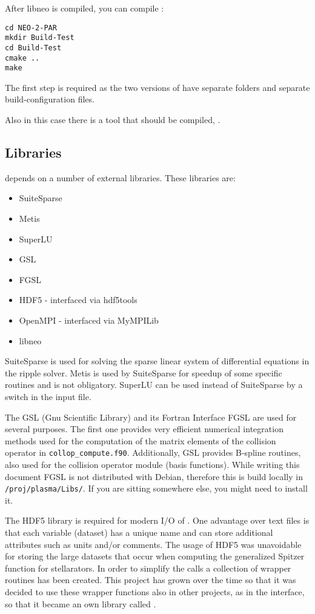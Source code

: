 \documentclass{article}
\newcommand{\vv}[1]{\texttt{\detokenize{#1}}}
\begin{document}
After libneo is compiled, you can compile \vv{neo-2}:
\begin{verbatim}
cd NEO-2-PAR
mkdir Build-Test
cd Build-Test
cmake ..
make
\end{verbatim}

The first step is required as the two versions of \vv{neo-2} have
separate folders and separate build-configuration files.

Also in this case there is a tool that should be compiled,
\vv{create_surfaces}.

\subsection{Libraries\label{technicalbackground_libraries}}
\vv{neo-2} depends on a number of external libraries. These libraries
are:
\begin{itemize}
\item SuiteSparse
\item Metis
\item SuperLU
\item GSL
\item FGSL
\item HDF5 - interfaced via hdf5tools
\item OpenMPI - interfaced via MyMPILib
\item libneo
\end{itemize}

SuiteSparse is used for solving the sparse linear system of differential
equations in the ripple solver. Metis is used by SuiteSparse for speedup
of some specific routines and is not obligatory. SuperLU can be used
instead of SuiteSparse by a switch in the input file.

The GSL (Gnu Scientific Library) and its Fortran Interface FGSL are used
for several purposes. The first one provides very efficient numerical
integration methods used for the computation of the matrix elements of
the collision operator in \verb|collop_compute.f90|. Additionally, GSL
provides B-spline routines, also used for the collision operator module
(basis functions). While writing this document FGSL is not distributed
with Debian, therefore this is build locally in \verb|/proj/plasma/Libs/|.
If you are sitting somewhere else, you might need to install it.

The HDF5 library is required for modern I/O of \vv{neo-2}. One advantage over
text files is that each variable (dataset) has a unique name and can
store additional attributes such as units and/or comments. The usage of HDF5
was unavoidable for storing the large datasets that occur when computing
the generalized Spitzer function for stellarators. In order to simplify
the calls a collection of wrapper routines has been created. This
project has grown over the time so that it was decided to use these
wrapper functions also in other projects, as in the interface, so that
it became an own library called \vv{hdf5tools}.
\end{document}
